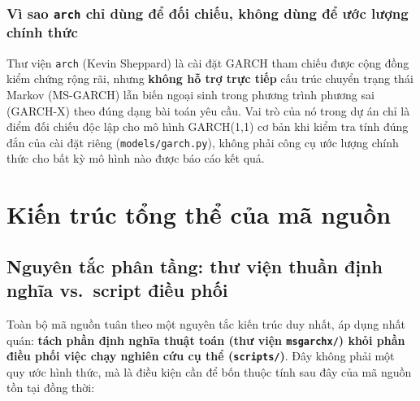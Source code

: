 \documentclass[11pt,a4paper]{article}
\newcommand{\code}[1]{\texttt{#1}}
\begin{document}
\subsubsection{Vì sao \code{arch} chỉ dùng để đối chiếu, không dùng để ước lượng chính thức}

Thư viện \code{arch} (Kevin Sheppard) là cài đặt GARCH tham chiếu được cộng đồng kiểm
chứng rộng rãi, nhưng \textbf{không hỗ trợ trực tiếp} cấu trúc chuyển trạng thái
Markov (MS-GARCH) lẫn biến ngoại sinh trong phương trình phương sai (GARCH-X) theo
đúng dạng bài toán yêu cầu. Vai trò của nó trong dự án chỉ là điểm đối chiếu độc lập
cho mô hình GARCH(1,1) cơ bản khi kiểm tra tính đúng đắn của cài đặt riêng
(\code{models/garch.py}), không phải công cụ ước lượng chính thức cho bất kỳ mô hình
nào được báo cáo kết quả.

\section{Kiến trúc tổng thể của mã nguồn}

\subsection{Nguyên tắc phân tầng: thư viện thuần định nghĩa vs.\ script điều phối}
\label{sec:layering}

Toàn bộ mã nguồn tuân theo một nguyên tắc kiến trúc duy nhất, áp dụng nhất quán:
\textbf{tách phần định nghĩa thuật toán (thư viện \code{msgarchx/}) khỏi phần điều
phối việc chạy nghiên cứu cụ thể (\code{scripts/})}. Đây không phải một quy ước hình
thức, mà là điều kiện cần để bốn thuộc tính sau đây của mã nguồn tồn tại đồng thời:
\end{document}
